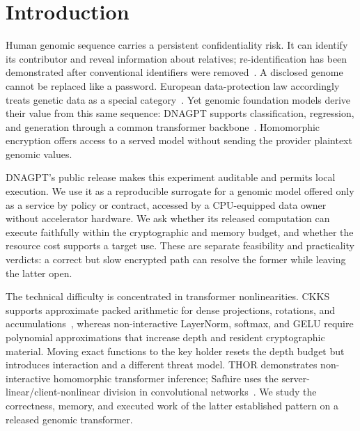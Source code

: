 %

\section{Introduction}

Human genomic sequence carries a persistent confidentiality risk. It can identify its contributor
and reveal information about relatives; re-identification has been demonstrated after conventional
identifiers were removed~\cite{gymrek2013,erlich2018}. A disclosed genome cannot be replaced like a
password. European data-protection law accordingly treats genetic data as a special
category~\cite{gdpr}. Yet genomic foundation models derive their value from this same sequence:
DNAGPT supports classification, regression, and generation through a common transformer
backbone~\cite{dnagpt2023}. Homomorphic encryption offers access to a served model without sending
the provider plaintext genomic values.

DNAGPT's public release makes this experiment auditable and permits local execution. We use it as a
reproducible surrogate for a genomic model offered only as a service by policy or contract, accessed
by a CPU-equipped data owner without accelerator hardware. We ask whether its released computation
can execute faithfully within the cryptographic and memory budget, and whether the resource cost
supports a target use. These are separate feasibility and practicality verdicts: a correct but slow
encrypted path can resolve the former while leaving the latter open.

The technical difficulty is concentrated in transformer nonlinearities. CKKS supports approximate
packed arithmetic for dense projections, rotations, and accumulations~\cite{ckks2017}, whereas
non-interactive LayerNorm, softmax, and GELU require polynomial approximations that increase depth
and resident cryptographic material. Moving exact functions to the key holder resets the depth
budget but introduces interaction and a different threat model. THOR demonstrates non-interactive
homomorphic transformer inference; Safhire uses the server-linear/client-nonlinear division in
convolutional networks~\cite{thor,safhire2025}. We study the correctness, memory, and executed work
of the latter established pattern on a released genomic transformer.

